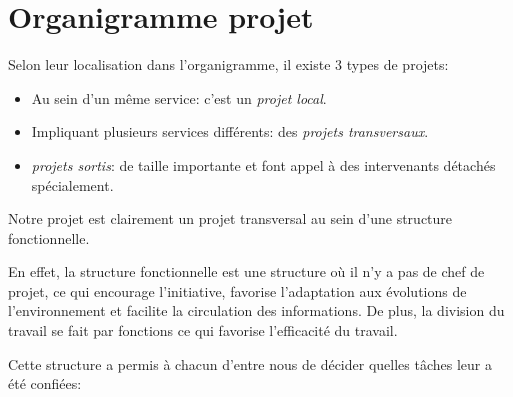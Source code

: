       \section{Organigramme projet}
      
      Selon leur localisation dans l'organigramme, il existe 3 types de projets:
      
      \begin{itemize}
          \item Au sein d'un même service: c'est un \textit{projet local}.
          \item Impliquant plusieurs services différents: des \textit{projets transversaux}.
          \item \textit{projets sortis}: de taille importante et font appel à des intervenants détachés spécialement.
      \end{itemize}
      
      Notre projet est clairement un projet transversal au sein d'une structure fonctionnelle.
      
      En effet, la structure fonctionnelle est une structure où il n'y a pas de chef de projet, ce qui encourage l'initiative, favorise l'adaptation aux évolutions de l'environnement et facilite la circulation des informations. De plus, la division du travail se fait par fonctions ce qui favorise l'efficacité du travail.
      
      Cette structure a permis à chacun d'entre nous de décider quelles tâches leur a été confiées:
      
